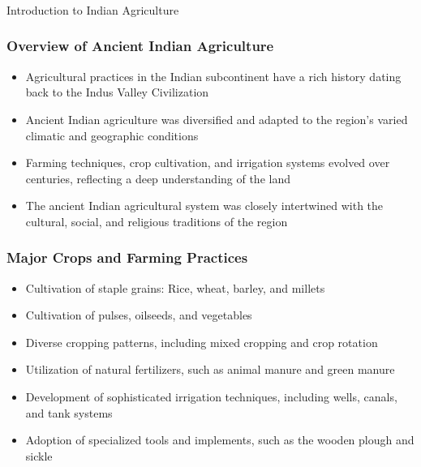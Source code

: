 \begin{frame}[fragile]\frametitle{}
\begin{center}
{\Large Introduction to Indian Agriculture}
\end{center}
\end{frame}

\begin{frame}[fragile]\frametitle{Overview of Ancient Indian Agriculture}
    \begin{itemize}
        \item Agricultural practices in the Indian subcontinent have a rich history dating back to the Indus Valley Civilization
        \item Ancient Indian agriculture was diversified and adapted to the region's varied climatic and geographic conditions
        \item Farming techniques, crop cultivation, and irrigation systems evolved over centuries, reflecting a deep understanding of the land
        \item The ancient Indian agricultural system was closely intertwined with the cultural, social, and religious traditions of the region
    \end{itemize}
\end{frame}

\begin{frame}[fragile]\frametitle{Major Crops and Farming Practices}
    \begin{itemize}
        \item Cultivation of staple grains: Rice, wheat, barley, and millets
        \item Cultivation of pulses, oilseeds, and vegetables
        \item Diverse cropping patterns, including mixed cropping and crop rotation
        \item Utilization of natural fertilizers, such as animal manure and green manure
        \item Development of sophisticated irrigation techniques, including wells, canals, and tank systems
        \item Adoption of specialized tools and implements, such as the wooden plough and sickle
    \end{itemize}
\end{frame}

